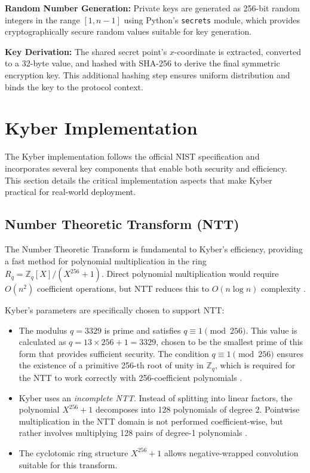 \textbf{Random Number Generation:} Private keys are generated as 256-bit random integers in the range $[1, n-1]$ using Python's \texttt{secrets} module, which provides cryptographically secure random values suitable for key generation.

\textbf{Key Derivation:} The shared secret point's $x$-coordinate is extracted, converted to a 32-byte value, and hashed with SHA-256 to derive the final symmetric encryption key. This additional hashing step ensures uniform distribution and binds the key to the protocol context.

\section{Kyber Implementation}

The Kyber implementation follows the official NIST specification and incorporates several key components that enable both security and efficiency. This section details the critical implementation aspects that make Kyber practical for real-world deployment.

\subsection{Number Theoretic Transform (NTT)}

The Number Theoretic Transform is fundamental to Kyber's efficiency, providing a fast method for polynomial multiplication in the ring $R_q = \mathbb{Z}_q[X]/(X^{256} + 1)$. Direct polynomial multiplication would require $O(n^2)$ coefficient operations, but NTT reduces this to $O(n \log n)$ complexity \cite{CLRS}.

Kyber's parameters are specifically chosen to support NTT:
\begin{itemize}
    \item The modulus $q = 3329$ is prime and satisfies $q \equiv 1 \pmod{256}$. This value is calculated as $q = 13 \times 256 + 1 = 3329$, chosen to be the smallest prime of this form that provides sufficient security. The condition $q \equiv 1 \pmod{256}$ ensures the existence of a primitive 256-th root of unity in $\mathbb{Z}_q$, which is required for the NTT to work correctly with 256-coefficient polynomials \cite{Kyber-Spec}.
    \item Kyber uses an \textit{incomplete NTT}. Instead of splitting into linear factors, the polynomial $X^{256} + 1$ decomposes into 128 polynomials of degree 2. Pointwise multiplication in the NTT domain is not performed coefficient-wise, but rather involves multiplying 128 pairs of degree-1 polynomials \cite{Kyber-Spec}.
    \item The cyclotomic ring structure $X^{256} + 1$ allows negative-wrapped convolution suitable for this transform.
\end{itemize}

